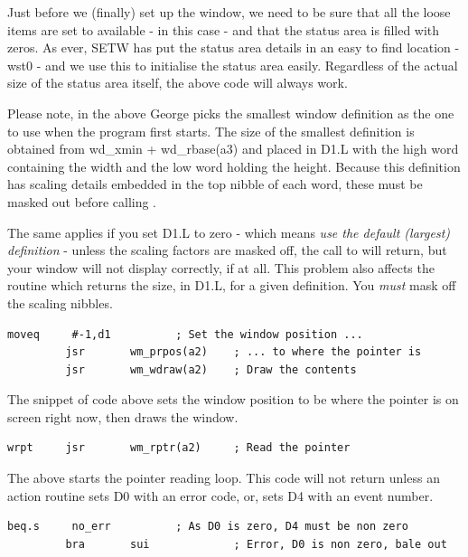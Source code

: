 Just before we (finally) set up the window, we need to be sure that all the
        loose items are set to available -{} in this case -{} and that the status area is
        filled with zeros. As ever, SETW has put the status
        area details in an easy to find location -{} wst0 -{} and we use this to initialise
        the status area easily. Regardless of the actual size of the status area itself,
        the above code will always work.

Please note, in the above George picks the smallest window definition as the
        one to use when the program first starts. The size of the smallest definition is
        obtained from wd\_xmin + wd\_rbase(a3) and placed in D1.L with the high word
        containing the width and the low word holding the height. Because this definition
        has scaling details embedded in the top nibble of each word, these must be masked
        out before calling .

The same applies if you set D1.L to zero -{} which means \emph{use the
        default (largest) definition} -{} unless the scaling factors are masked
        off, the call to  will return, but your window will not display correctly,
        if at all. This problem also affects the  routine which returns the size,
        in D1.L, for a given definition. You \emph{must} mask off the
        scaling nibbles.

\begin{lstlisting}[firstnumber=last,caption={Ex0 - Position and Draw Window}]
         moveq     #-1,d1          ; Set the window position ...
         jsr       wm_prpos(a2)    ; ... to where the pointer is
         jsr       wm_wdraw(a2)    ; Draw the contents
\end{lstlisting}

The snippet of code above sets the window position to be where the pointer
        is on screen right now, then draws the window.

\begin{lstlisting}[firstnumber=last,caption={Ex0 - Reading the Pointer}]
wrpt     jsr       wm_rptr(a2)     ; Read the pointer
\end{lstlisting}

The above starts the pointer reading loop. This code will not return unless
        an action routine sets D0 with an error code, or, sets D4 with an event
        number.

\begin{lstlisting}[firstnumber=last,caption={Ex0 - Test for Errors or Events}]
         beq.s     no_err          ; As D0 is zero, D4 must be non zero
         bra       sui             ; Error, D0 is non zero, bale out
\end{lstlisting}

